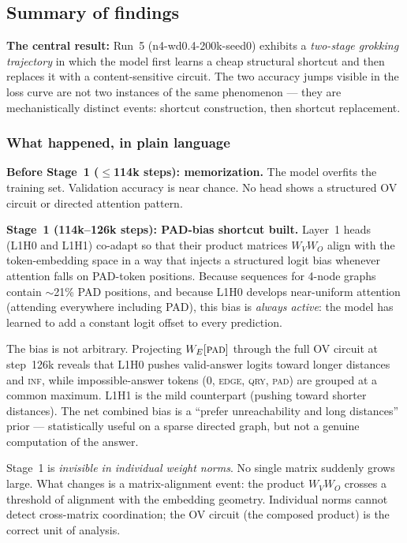 \documentclass[11pt, a4paper]{article}
\begin{document}
\subsection{Summary of findings}
\label{sec:findings-summary}

\textbf{The central result:} Run~5 (n4-wd0.4-200k-seed0) exhibits a
\emph{two-stage grokking trajectory} in which the model first learns a cheap
structural shortcut and then replaces it with a content-sensitive circuit.
The two accuracy jumps visible in the loss curve are not two instances of the
same phenomenon --- they are mechanistically distinct events: shortcut
construction, then shortcut replacement.

\subsubsection*{What happened, in plain language}

\textbf{Before Stage~1 ($\le$114k steps): memorization.}
The model overfits the training set. Validation accuracy is near chance.
No head shows a structured OV circuit or directed attention pattern.

\textbf{Stage~1 (114k--126k steps): PAD-bias shortcut built.}
Layer~1 heads (L1H0 and L1H1) co-adapt so that their product matrices
$W_V W_O$ align with the token-embedding space in a way that injects a
structured logit bias whenever attention falls on PAD-token positions.
Because sequences for 4-node graphs contain $\sim$21\% PAD positions,
and because L1H0 develops near-uniform attention (attending everywhere
including PAD), this bias is \emph{always active}: the model has learned to
add a constant logit offset to every prediction.

The bias is not arbitrary. Projecting $W_E[\textsc{pad}]$ through the full
OV circuit at step~126k reveals that L1H0 pushes valid-answer logits toward
longer distances and \textsc{inf}, while impossible-answer tokens (0,
\textsc{edge}, \textsc{qry}, \textsc{pad}) are grouped at a common
maximum. L1H1 is the mild counterpart (pushing toward shorter distances).
The net combined bias is a ``prefer unreachability and long distances''
prior --- statistically useful on a sparse directed graph, but not a genuine
computation of the answer.

Stage~1 is \emph{invisible in individual weight norms}. No single matrix
suddenly grows large. What changes is a matrix-alignment event: the product
$W_V W_O$ crosses a threshold of alignment with the embedding geometry.
Individual norms cannot detect cross-matrix coordination; the OV circuit
(the composed product) is the correct unit of analysis.
\end{document}
